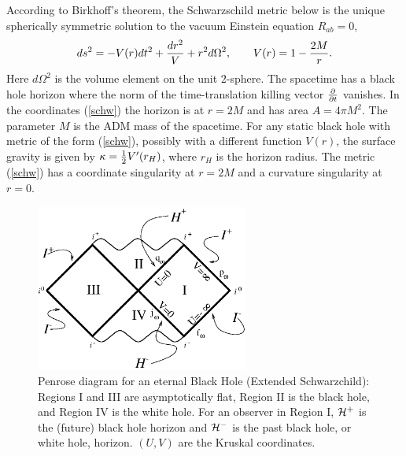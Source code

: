 \documentclass[12pt]{article}
\newcommand{\be}{\begin{equation}}
\newcommand{\ee}{\end{equation}}
\def\fh{{\cal H}^+}
\def\ph{{\cal H}^-}
\begin{document}
According to Birkhoff's theorem, the Schwarzschild metric below is the
unique spherically
symmetric solution to the vacuum Einstein equation $R_{ab}=0$,
%
\be\label{schw}ds^2  = -V(r)dt^2 +{dr^2 \over V} +r^2
d\Omega ^2,\qquad V(r) = 1-{2M\over r}.\ee
%
Here $d\Omega ^2$ is the volume element on the unit $2$-sphere.  The
spacetime has a black
hole horizon where the norm of the time-translation
killing vector ${\partial \over \partial t}$ vanishes.  In
the  coordinates (\ref{schw}) the horizon is at $r=2M$ and has area $A=4\pi
M^2$.
The parameter $M$ is the ADM mass of the spacetime.  For any static black
hole with
metric of the form (\ref{schw}), possibly with a different function $V(r)$,
the surface
gravity is given by $\kappa ={1\over 2} V'(r_H )$, where $r_H$ is the
horizon radius. The
metric (\ref{schw})  has a coordinate singularity at $r=2M$ and a curvature
singularity at
$r=0$.
%
\begin{figure}[tb]
\begin{center}
\includegraphics[width=2.75in]{kruskal.eps}
\end{center}
\caption{Penrose diagram for an eternal Black Hole (Extended Schwarzchild):
Regions I and III are
asymptotically flat, Region II is the black hole, and Region IV is the
white hole.
For an observer in Region I, $\fh$ is the (future) black hole horizon and $\ph$
is the past black hole, or white hole, horizon. $(U,V)$ are the Kruskal
coordinates.}
\label{f3}
\end{figure}
%
\end{document}
